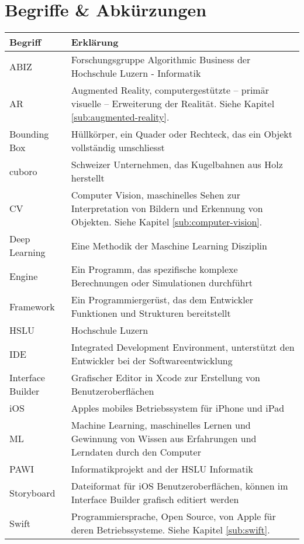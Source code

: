 \section*{Begriffe \& Abkürzungen}

\begin{table}[htb!]
	\begin{tabular}{@{} p{} p{} @{}}
		\hline
		\textbf{Begriff} & \textbf{Erklärung} \\
		\hline
		ABIZ	& Forschungsgruppe Algorithmic Business der Hochschule Luzern - Informatik \\
		AR 		& Augmented Reality, computergestützte – primär visuelle – Erweiterung der Realität. Siehe Kapitel \ref{sub:augmented-reality}. \\
		Bounding Box & Hüllkörper, ein Quader oder Rechteck, das ein Objekt vollständig umschliesst \\
		cuboro	& Schweizer Unternehmen, das Kugelbahnen aus Holz herstellt \\
		CV		& Computer Vision, maschinelles Sehen zur Interpretation von Bildern und Erkennung von Objekten. Siehe Kapitel \ref{sub:computer-vision}. \\
		Deep Learning & Eine Methodik der Maschine Learning Disziplin \\
		Engine	& Ein Programm, das spezifische komplexe Berechnungen oder Simulationen durchführt \\
		Framework	& Ein Programmiergerüst, das dem Entwickler Funktionen und Strukturen bereitstellt \\
		HSLU	& Hochschule Luzern \\
		IDE 	& Integrated Development Environment, unterstützt den Entwickler bei der Softwareentwicklung \\
		Interface Builder & Grafischer Editor in Xcode zur Erstellung von Benutzeroberflächen \\
		iOS		& Apples mobiles Betriebssystem für iPhone und iPad \\
		ML		& Machine Learning, maschinelles Lernen und Gewinnung von Wissen aus Erfahrungen und Lerndaten durch den Computer \\
		PAWI	& Informatikprojekt and der HSLU Informatik \\
		Storyboard & Dateiformat für iOS Benutzeroberflächen, können im Interface Builder grafisch editiert werden \\
		Swift	& Programmiersprache, Open Source, von Apple für deren Betriebssysteme. Siehe Kapitel \ref{sub:swift}. \\

\end{tabular}
\end{table}
